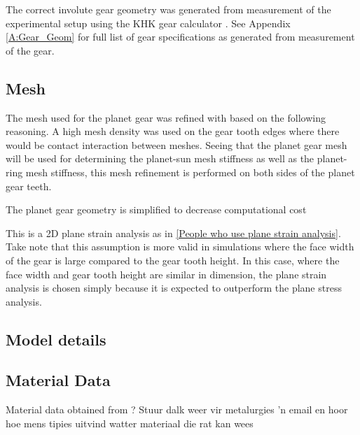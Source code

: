 The correct involute gear geometry was generated from measurement of the experimental setup using the KHK gear calculator \cite{KHK2015}. See Appendix \ref{A:Gear_Geom} for full list of gear specifications as generated from measurement of the gear. 


\subsection{Mesh}
The mesh used for the planet gear was refined with based on the following reasoning. A high mesh density was used on the gear tooth edges where there would be contact interaction between meshes. Seeing that the planet gear mesh will be used for determining the planet-sun mesh stiffness as well as the planet-ring mesh stiffness, this mesh refinement is performed on both sides of the planet gear teeth. 

The planet gear geometry is simplified to decrease computational cost


This is a 2D plane strain analysis as in \ref{People who use plane strain analysis}. Take note that this assumption is more valid in simulations where the face width of the gear is large compared to the gear tooth height. In this case, where the face width and gear tooth height are similar in dimension, the plane strain analysis is chosen simply because it is expected to outperform the plane stress analysis. 

\subsection{Model details}

\begin{table}[]
	\centering
\end{table}


\subsection{Material Data}
Material data obtained from ? Stuur dalk weer vir metalurgies 'n email en hoor hoe mens tipies uitvind watter materiaal die rat kan wees

